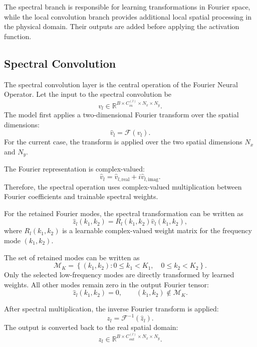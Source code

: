 The spectral branch is responsible for learning transformations in Fourier space, while the local convolution branch provides additional local spatial processing in the physical domain. Their outputs are added before applying the activation function.

\subsection{Spectral Convolution}

The spectral convolution layer is the central operation of the Fourier Neural Operator. Let the input to the spectral convolution be
\begin{equation}
v_l
\in
\mathbb{R}^{B \times C_{in}^{(l)} \times N_x \times N_y}.
\end{equation}
The model first applies a two-dimensional Fourier transform over the spatial dimensions:
\begin{equation}
\hat{v}_l
=
\mathcal{F}(v_l).
\end{equation}
For the current case, the transform is applied over the two spatial dimensions \(N_x\) and \(N_y\).

The Fourier representation is complex-valued:
\begin{equation}
\hat{v}_l
=
\hat{v}_{l,\mathrm{real}}
+
i\hat{v}_{l,\mathrm{imag}}.
\end{equation}
Therefore, the spectral operation uses complex-valued multiplication between Fourier coefficients and trainable spectral weights.

For the retained Fourier modes, the spectral transformation can be written as
\begin{equation}
\hat{z}_l(k_1,k_2)
=
R_l(k_1,k_2)
\hat{v}_l(k_1,k_2),
\end{equation}
where \(R_l(k_1,k_2)\) is a learnable complex-valued weight matrix for the frequency mode \((k_1,k_2)\).

The set of retained modes can be written as
\begin{equation}
\mathcal{M}_K
=
\left\{
(k_1,k_2)
:
0 \leq k_1 < K_1,
\quad
0 \leq k_2 < K_2
\right\}.
\end{equation}
Only the selected low-frequency modes are directly transformed by learned weights. All other modes remain zero in the output Fourier tensor:
\begin{equation}
\hat{z}_l(k_1,k_2)
=
0,
\qquad
(k_1,k_2) \notin \mathcal{M}_K.
\end{equation}

After spectral multiplication, the inverse Fourier transform is applied:
\begin{equation}
z_l
=
\mathcal{F}^{-1}
\left(
\hat{z}_l
\right).
\end{equation}
The output is converted back to the real spatial domain:
\begin{equation}
z_l
\in
\mathbb{R}^{B \times C_{out}^{(l)} \times N_x \times N_y}.
\end{equation}

